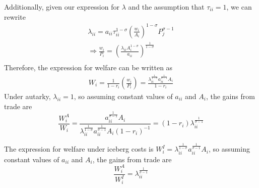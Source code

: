 \documentclass{article}
\begin{document}
\begin{enumerate}
	Additionally, given our expression for $\lambda$ and the assumption that $\tau_{ii}=1$, we can rewrite 
	\begin{gather*}
		\lambda_{ii} = a_{ii}\tau_{ii}^{1-\sigma}\left(\frac{w_i}{A_i}\right)^{1-\sigma}P_{j}^{\sigma-1}\\
		\Rightarrow \frac{w_{i}}{P_{i}} = \left(\frac{\lambda_{ii}A_i^{1-\sigma}}{a_{ii}}\right)^{\frac{1}{1-\sigma}}\\
	\end{gather*}
	Therefore, the expression for welfare can be written as
	\begin{gather*}
		W_{i} = \frac{1}{1-r_{i}}\left(\frac{w_{i}}{P_{i}}\right)= \frac{\lambda_{ii}^{\frac{1}{1-\sigma}}a_{ii}^{\frac{1}{\sigma-1}}A_{i}}{1-r_{i}}
	\end{gather*}
	Under autarky, $\lambda_{ii}=1$, so assuming constant values of $a_{ii}$ and $A_{i}$, the gains from trade are
	\[
		\frac{W_{i}^{A}}{W_{i}} =  \frac{a_{ii}^{\frac{1}{\sigma-1}}A_{i}}{\lambda_{ii}^{\frac{1}{1-\sigma}}a_{ii}^{\frac{1}{\sigma-1}}A_{i}(1-r_{i})^{-1}} = (1-r_{i})\lambda_{ii}^{\frac{1}{\sigma-1}}
	\]
		
	The expression for welfare under iceberg costs is $W_{i}^{I} = \lambda_{ii}^{\frac{1}{1-\sigma}}a_{ii}^{\frac{1}{\sigma-1}}A_{i}$, so assuming constant values of $a_{ii}$ and $A_{i}$, the gains from trade are
	\[
		\frac{W_{i}^{A}}{W_{i}^{I}} = \lambda_{ii}^{\frac{1}{\sigma-1}}
	\]
\end{enumerate}
\end{document}
